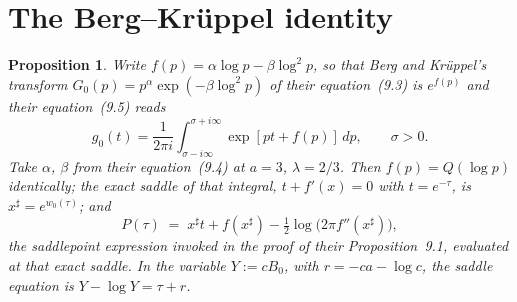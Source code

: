 \documentclass[11pt]{article}
\newtheorem{proposition}[theorem]{Proposition}
\theoremstyle{definition}
\theoremstyle{remark}
\begin{document}
\section{The Berg--Kr\"uppel identity}
\label{sec:bk}

\begin{proposition}
\label{prop:bkidentity}
Write $f(p) = \alpha\log p-\beta\log^2 p$, so that Berg and Kr\"uppel's transform $G_0(p) =
p^\alpha\exp(-\beta\log^2 p)$ of their equation~(9.3) is $e^{f(p)}$ and their equation~(9.5) reads
\[
g_0(t) = \frac{1}{2\pi i}\int_{\sigma-i\infty}^{\sigma+i\infty}\exp[pt+f(p)]\,dp, \qquad \sigma>0.
\]
Take $\alpha$, $\beta$ from their equation~(9.4) at $a=3$, $\lambda=2/3$. Then $f(p) = Q(\log p)$
identically; the exact saddle of that integral, $t+f'(x)=0$ with $t = e^{-\tau}$, is $x^\sharp =
e^{w_0(\tau)}$; and
\[
P(\tau) \;=\; x^\sharp t + f(x^\sharp) - \tfrac12\log\bigl(2\pi f''(x^\sharp)\bigr),
\]
the saddlepoint expression invoked in the proof of their Proposition~9.1, evaluated at that exact
saddle. In the variable $Y := cB_0$, with $r = -ca-\log c$, the saddle equation is $Y-\log Y =
\tau+r$.
\end{proposition}
\end{document}
